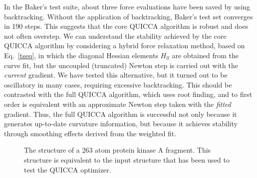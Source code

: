 \documentclass[prl,twocolumn,showpacs,twocolumngrid,superbib]{revtex4}
\begin{document}
In the Baker's test suite, about three force evaluations have been saved by 
using backtracking. Without the application of backtracking, Baker's test set
converges in 190 steps. 
This suggests that the core QUICCA algorithm is robust and
does not often overstep.  We can understand the stability achieved by the core QUICCA
algorithm by considering a hybrid force relaxation method, based on Eq.~\ref{tseq},
in which the diagonal Hessian elements $H_{ll}$ are obtained from the 
curve fit, but the uncoupled (truncated) Newton step is carried out with the {\em current} 
gradient.  We have tested this alternative, but it turned out to be oscillatory 
in many cases, requiring excessive backtracking.  This should be contrasted with the
full QUICCA algorithm, which uses root finding, and to first order is equivalent with 
an approximate Newton step taken with the {\em fitted} gradient.   Thus, the full 
QUICCA algorithm is successful not only because it generates up-to-date curvature information, 
but because it achieves stability through smoothing effects derived from the weighted fit.

\begin{figure}[h]
\caption{
The structure of a 263 atom protein kinase A fragment. This structure
is equivalent to the input structure that has been used
to test the QUICCA optimizer.}\label{kinasepicture} 
\end{figure}
\end{document}
